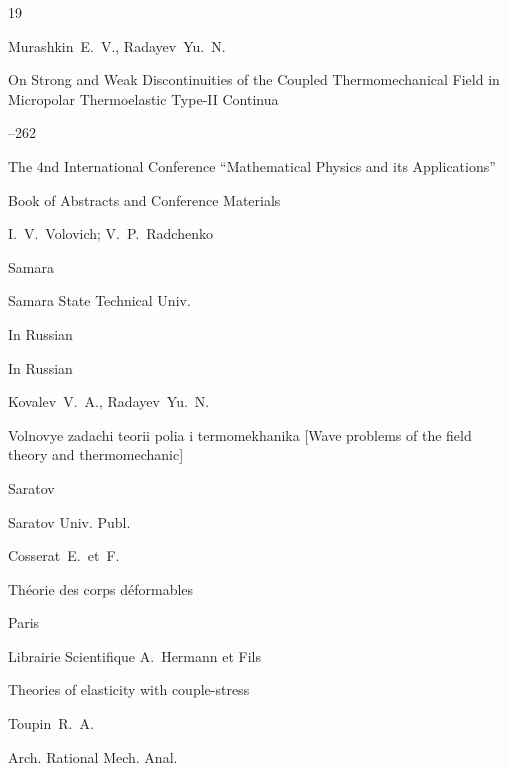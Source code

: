 \begin{thebibliography}{19}




\by Murashkin~E.~V., Radayev~Yu.~N.

\paper On Strong and Weak Discontinuities of the Coupled Thermomechanical Field in Micropolar Thermoelastic Type-II Continua

--262

\inbook  The 4nd International Conference ``Mathematical Physics and its Applications''

\bookinfo Book of Abstracts and Conference Materials

\eds I.~V.~Volovich; V.~P.~Radchenko

\publaddr Samara

\publ Samara State Technical Univ.


\lang In Russian




\lang In Russian

\by Kovalev~V.~A., Radayev~Yu.~N.

\book Volnovye zadachi teorii polia i termomekhanika \rm [Wave problems of the field theory and thermomechanic]

\publaddr Saratov

\publ Saratov Univ. Publ.








\by Cosserat~E.~et~F.

\book Th\'eorie des corps d\'eformables

\publaddr Paris

\publ Librairie Scientifique A.~Hermann et Fils






\paper Theories of elasticity with couple-stress

\by Toupin~R.~A.

\jour Arch. Rational Mech. Anal.


\end{thebibliography}
